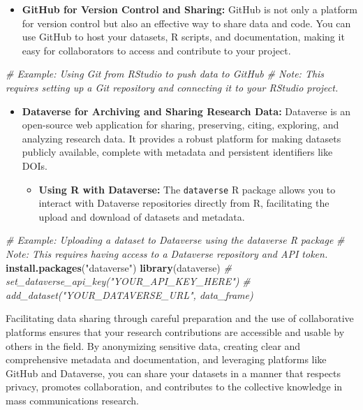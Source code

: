 \documentclass[
]{book}
\newenvironment{Shaded}{\begin{snugshade}}{\end{snugshade}}
\newcommand{\CommentTok}[1]{\textcolor[rgb]{0.56,0.35,0.01}{\textit{#1}}}
\newcommand{\FunctionTok}[1]{\textcolor[rgb]{0.13,0.29,0.53}{\textbf{#1}}}
\newcommand{\NormalTok}[1]{#1}
\newcommand{\StringTok}[1]{\textcolor[rgb]{0.31,0.60,0.02}{#1}}
\providecommand{\tightlist}{%
  \setlength{\itemsep}{0pt}\setlength{\parskip}{0pt}}
\begin{document}
\begin{itemize}
\tightlist
\item
  \textbf{GitHub for Version Control and Sharing:} GitHub is not only a platform for version control but also an effective way to share data and code. You can use GitHub to host your datasets, R scripts, and documentation, making it easy for collaborators to access and contribute to your project.
\end{itemize}

\begin{Shaded}
\begin{Highlighting}[]
\CommentTok{\# Example: Using Git from RStudio to push data to GitHub}
\CommentTok{\# Note: This requires setting up a Git repository and connecting it to your RStudio project.}
\end{Highlighting}
\end{Shaded}

\begin{itemize}
\item
  \textbf{Dataverse for Archiving and Sharing Research Data:} Dataverse is an open-source web application for sharing, preserving, citing, exploring, and analyzing research data. It provides a robust platform for making datasets publicly available, complete with metadata and persistent identifiers like DOIs.

  \begin{itemize}
  \tightlist
  \item
    \textbf{Using R with Dataverse:} The \texttt{dataverse} R package allows you to interact with Dataverse repositories directly from R, facilitating the upload and download of datasets and metadata.
  \end{itemize}
\end{itemize}

\begin{Shaded}
\begin{Highlighting}[]
\CommentTok{\# Example: Uploading a dataset to Dataverse using the dataverse R package}
\CommentTok{\# Note: This requires having access to a Dataverse repository and API token.}
\FunctionTok{install.packages}\NormalTok{(}\StringTok{"dataverse"}\NormalTok{)}
\FunctionTok{library}\NormalTok{(dataverse)}
\CommentTok{\# set\_dataverse\_api\_key("YOUR\_API\_KEY\_HERE")}
\CommentTok{\# add\_dataset("YOUR\_DATAVERSE\_URL", data\_frame)}
\end{Highlighting}
\end{Shaded}

Facilitating data sharing through careful preparation and the use of collaborative platforms ensures that your research contributions are accessible and usable by others in the field. By anonymizing sensitive data, creating clear and comprehensive metadata and documentation, and leveraging platforms like GitHub and Dataverse, you can share your datasets in a manner that respects privacy, promotes collaboration, and contributes to the collective knowledge in mass communications research.
\end{document}
